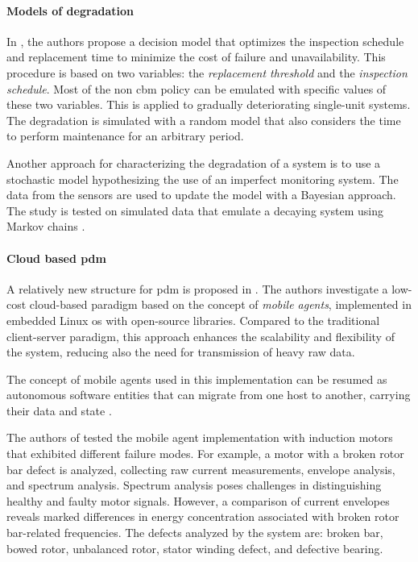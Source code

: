 \paragraph{Models of degradation}
In \cite{Pred_Maint_Tech_Grall}, the authors propose a decision model that optimizes the inspection schedule and replacement time to minimize the cost of failure and unavailability. This procedure is based on two variables: the \emph{replacement threshold} and the \emph{inspection schedule}. Most of the non \gls{cbm} policy can be emulated with specific values of these two variables. This is applied to gradually deteriorating single-unit systems. The degradation is simulated with a random model that also considers the time to perform maintenance for an arbitrary period.

Another approach for characterizing the degradation of a system is to use a stochastic model hypothesizing the use of an imperfect monitoring system. The data from the sensors are used to update the model with a Bayesian approach. The study is tested on simulated data that emulate a decaying system using Markov chains \cite{CURCURU2010989}\cite{GALANTE19981361}.

\paragraph{Cloud based \gls{pdm}}
A relatively new structure for \gls{pdm} is proposed in \cite{CloudBased_Wang}. The authors investigate a low-cost cloud-based paradigm based on the concept of \emph{mobile agents}, implemented in embedded Linux \gls{os} with open-source libraries. Compared to the traditional client-server paradigm, this approach enhances the scalability and flexibility of the system, reducing also the need for transmission of heavy raw data.

The concept of mobile agents used in this implementation can be resumed as autonomous software entities that can migrate from one host to another, carrying their data and state \cite{CUCURULL2009712}.

The authors of \cite{CloudBased_Wang} tested the mobile agent implementation with induction motors that exhibited different failure modes. For example, a motor with a broken rotor bar defect is analyzed, collecting raw current measurements, envelope analysis, and spectrum analysis. Spectrum analysis poses challenges in distinguishing healthy and faulty motor signals. However, a comparison of current envelopes reveals marked differences in energy concentration associated with broken rotor bar-related frequencies. The defects analyzed by the system are: broken bar, bowed rotor, unbalanced rotor, stator winding defect, and defective bearing.

